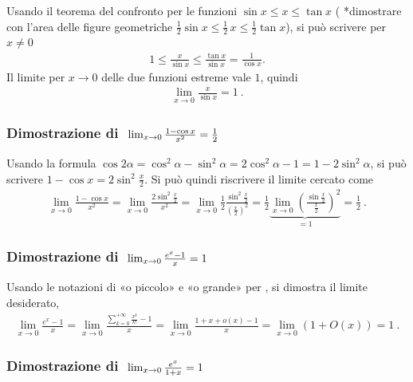 \documentclass[letterpaper,10pt,italian]{jupyterBook}
\begin{document}
\sphinxAtStartPar
Usando il teorema del confronto per le funzioni \(\sin x \le x \le \tan x\) ( *dimostrare con l’area delle figure geometriche \(\frac{1}{2}\sin x \le \frac{1}{2} \, x \le \frac{1}{2} \tan x\)), si può scrivere per \(x \ne 0\)
\begin{equation*}
\begin{split}1 \le \frac{x}{\sin x} \le \frac{\tan x}{\sin x} = \frac{1}{\cos x} .\end{split}
\end{equation*}
\sphinxAtStartPar
Il limite per \(x \rightarrow 0\) delle due funzioni estreme vale \(1\), quindi
\begin{equation*}
\begin{split}\lim_{x \rightarrow 0} \frac{x}{\sin x} = 1 \ .\end{split}
\end{equation*}\subsubsection*{Dimostrazione di \protect\(\ \lim_{x \rightarrow 0} \frac{1 - \cos x}{x^2} = \frac{1}{2} \protect\)}

\sphinxAtStartPar
Usando la formula \(\cos 2 \alpha = \cos^2 \alpha - \sin^2 \alpha = 2 \cos^2 \alpha - 1 = 1 - 2 \sin^2 \alpha\), si può scrivere \(1 - \cos x = 2 \sin^2 \frac{x}{2}\). Si può quindi riscrivere il limite cercato come
\begin{equation*}
\begin{split}\lim_{x \rightarrow 0} \frac{1 - \cos x}{x^2} = \lim_{x \rightarrow 0} \frac{ 2 \sin^2 \frac{x}{2} }{x^2} = \lim_{x \rightarrow 0} \frac{1}{2} \frac{\sin^2 \frac{x}{2}}{\left( \frac{x}{2} \right)^2} = \frac{1}{2} \underbrace{\lim_{x \rightarrow 0} \left( \frac{\sin \frac{x}{2}}{\frac{x}{2}} \right)^2}_{=1} = \frac{1}{2} \ .\end{split}
\end{equation*}\subsubsection*{Dimostrazione di \protect\(\ \lim_{x \rightarrow 0} \frac{e^x - 1}{x}= 1 \protect\)}

\sphinxAtStartPar
Usando le notazioni di «o piccolo» e «o grande» per {\hyperref[\detokenize{ch/infinitesimal_calculus/analysis:infinitesimal-calculus-limits-infinite-simal}]{}}, si dimostra il limite desiderato,
\begin{equation*}
\begin{split}\lim_{x \rightarrow 0} \frac{e^x - 1}{x} = \lim_{x \rightarrow 0} \frac{\sum_{k=0}^{+\infty} \frac{x^k}{k!} - 1}{x} = \lim_{x \rightarrow 0} \frac{1 + x + o(x) - 1}{x} = \lim_{x \rightarrow 0} \left( 1 + O(x) \right) = 1 \ .\end{split}
\end{equation*}\subsubsection*{Dimostrazione di \protect\(\ \lim_{x \rightarrow 0} \frac{e^x}{1 + x} = 1 \protect\)}
\end{document}
